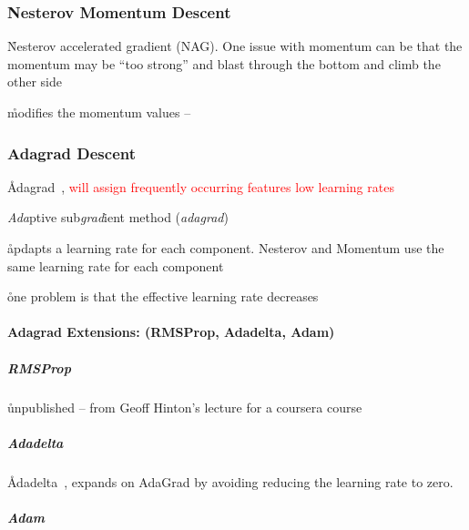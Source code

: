 

\subsubsection{Nesterov Momentum Descent}

\r{Nesterov accelerated gradient (NAG). One issue with momentum can be that the momentum may be ``too strong'' and blast through the bottom and climb the other side}

\r{modifies the momentum values -- }





\subsubsection{Adagrad Descent}

\r{Adagrad~\cite{duchi2011adaptive}, \textcolor{red}{will assign frequently occurring features low learning rates}}

\r{\textit{Ada}ptive sub\textit{grad}ient method (\textit{adagrad})}

\r{apdapts a learning rate for each component. Nesterov and Momentum use the same learning rate for each component}

\r{one problem is that the effective learning rate decreases}

\paragraph{Adagrad Extensions: (RMSProp, Adadelta, Adam)}


\subparagraph{RMSProp}

\r{unpublished -- from Geoff Hinton's lecture for a coursera course}

\subparagraph{Adadelta}


\r{Adadelta~\cite{zeiler2012adadelta}, expands on AdaGrad by avoiding reducing the learning rate to zero.}


\subparagraph{Adam}

